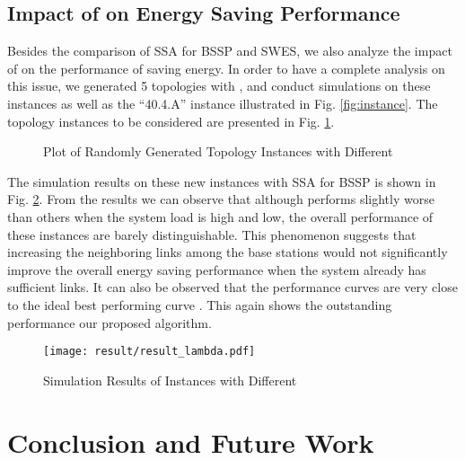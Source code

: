 \documentclass[conference]{IEEEtran}
\begin{document}
\subsection{Impact of  on Energy Saving Performance}
Besides the comparison of SSA for BSSP and SWES, we also analyze the impact of  on the performance of saving energy. In order to have a complete analysis on this issue, we generated 5 topologies with ,  and conduct simulations on these instances as well as the ``40.4.A'' instance illustrated in Fig. \ref{fig:instance}. The topology instances to be considered are presented in Fig. \ref{fig:lambda}.

\begin{figure}
  \center
 
  \caption{Plot of Randomly Generated Topology Instances with Different }
  \label{fig:lambda}
\end{figure}

The simulation results on these new instances with SSA for BSSP is shown in Fig. \ref{fig:lambdaresult}. From the results we can observe that although  performs slightly worse than others when the system load is high and low, the overall performance of these instances are barely distinguishable. This phenomenon suggests that increasing the neighboring links among the base stations would not significantly improve the overall energy saving performance when the system already has sufficient links. It can also be observed that the performance curves are very close to the ideal best performing curve . This again shows the outstanding performance our proposed algorithm.

\begin{figure}
  \center
  \texttt{[image: result/result\_lambda.pdf]}
  \caption{Simulation Results of Instances with Different }
  \label{fig:lambdaresult}
\end{figure}

\section{Conclusion and Future Work}\label{sec:conclusion}
\end{document}
